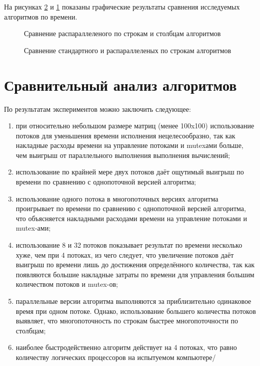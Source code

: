 На рисунках \ref{ris:graph1} и \ref{ris:graph2} показаны графические результаты сравнения исследуемых алгоритмов по времени. 

\begin{figure}[H]
    \caption{Сравнение распараллеленого по строкам и столбцам алгоритмов}
    \label{ris:graph2}
\end{figure}

\begin{figure}[H]
    \caption{Сравнение стандартного и распараллеленых по строкам алгоритмов}
    \label{ris:graph1}
\end{figure}

\section{Сравнительный анализ алгоритмов}\label{comparepart}

По результатам экспериментов можно заключить следующее:
\begin{enumerate}
    \item при относительно небольшом размере матриц (менее 100x100) использование потоков для уменьшения времени исполнения 
    нецелесообразно, так как накладные расходы времени на управление потоками и mutexами больше, чем выигрыш от параллельного выполнения 
    выполнения вычислений;
    \item использование по крайней мере двух потоков даёт ощутимый выигрыш по времени по сравнению с однопоточной версией алгоритма; 
    \item использование одного потока в многопоточных версиях алгоритма проигрывает по времени по сравнению с однопоточной версией 
    алгоритма, что объясняется накладными расходами времени на управление потоками и mutex-ами;
    \item использование 8 и 32 потоков показывает результат по времени несколько хуже, чем при 4 потоках, из чего следует, 
    что увеличение потоков даёт выигрыш по времени лишь до достижения определённого количества, так как появляются большие накладные 
    затраты по времени для управления большим количеством потоков и mutex-ов;
    \item параллельные версии алгоритма выполняются за приблизительно одинаковое время при одном потоке. Однако, использование большего 
    количества потоков выявляет, что многопоточность по строкам быстрее многопоточности по столбцам;
    \item наиболее быстродейственно алгоритм действует на 4 потоках, что равно количеству логических процессоров на испытуемом компьютере/
\end{enumerate}

